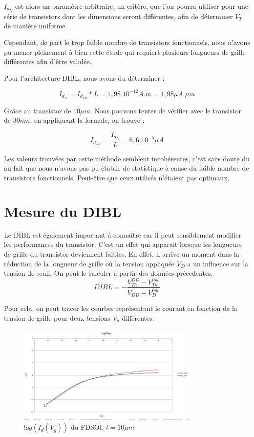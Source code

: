 \documentclass[a4paper,11pt]{report}
\begin{document}
$I_{d_{N}}$ est alors un paramètre arbitraire, un critère, que l'on pourra utiliser pour une série de transistors dont les dimensions seront différentes, afin de déterminer $V_T$ de manière uniforme.

Cependant, de part le trop faible nombre de transistors fonctionnels, nous n'avons pu mener pleinement à bien cette étude qui requiert plusieurs longueurs de grille différentes afin d'être validée.

Pour l'architecture DIBL, nous avons du déterminer :

\[I_{d_{N}}=I_{d_{TH}}*L=1,98.10^{-12} A.m = 1,98 \mu A.\mu m\]

Grâce au transistor de $10\mu m$. Nous pouvons tenter de vérifier avec le transistor de $30nm$, en appliquant la formule, on trouve : 

\[I_{d_{TH}}=\dfrac{I_{d_{N}}}{L} = 6,6.10^{-5}\mu A\]

Les valeurs trouvées par cette méthode semblent incohérentes, c'est sans doute du au fait que nous n'avons pas pu établir de statistique à cause du faible nombre de transistors fonctionnels. Peut-être que ceux utilisés n'étaient pas optimaux.


\chapter{Mesure du DIBL}
Le DIBL est également important à connaître car il peut sensiblement modifier les performances du transistor. C'est un effet qui apparait lorsque les  longueurs de grille du transistor deviennent faibles. En effet, il arrive un moment dans la réduction de la longueur de grille où la tension appliquée $V_D$ a un influence sur la tension de seuil.
On peut le calculer à partir des données précedentes.
\[ DIBL = -\frac{V^{DD}_{Th} - V^{low}_{Th}}{V_{DD} - V^{low}_{D}}
\]

Pour cela, on peut tracer les courbes représentant le courant en fonction de la tension de grille pour deux tensions $V_d$ différentes.

\begin{figure}[h]
    \begin{center}
        \includegraphics[width=0.8\textwidth]{Images/logidvg10um}
        \caption{$log(I_d(V_g))$ du FDSOI, $l = 10\mu m$}
        \label{logidvg_fdsoi_10um}
    \end{center}
\end{figure}
\end{document}
